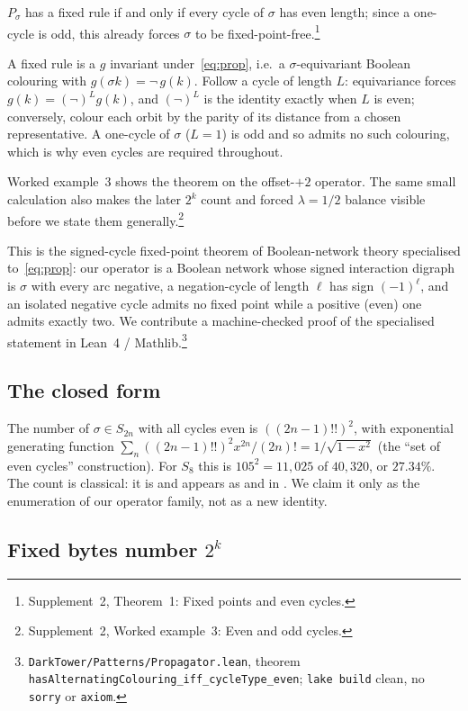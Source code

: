 \documentclass[man,12pt,floatsintext,donotrepeattitle]{apa7}
\newcommand{\sig}{\sigma}
\newcommand{\supptheorytext}[2]{Supplement~2, #1: #2.}
\newcommand{\supptheory}[2]{\footnote{\supptheorytext{#1}{#2}}}
\begin{document}
$P_\sig$ has a fixed rule if and only if every cycle of $\sig$ has even length;
since a one-cycle is odd, this already forces $\sig$ to be fixed-point-free.\supptheory{Theorem~1}{Fixed points and even cycles}

\noindent A fixed rule is a $g$ invariant under~\eqref{eq:prop}, i.e.\ a
$\sig$-equivariant Boolean colouring with $g(\sig k) = \lnot\,g(k)$.
Follow a cycle of length $L$: equivariance forces
$g(k) = (\lnot)^{L} g(k)$, and $(\lnot)^{L}$ is the identity exactly when
$L$ is even; conversely, colour each orbit by the parity of its distance
from a chosen representative. A one-cycle of $\sig$ ($L=1$) is odd and so
admits no such colouring, which is why even cycles are required throughout.

Worked example~3 shows the theorem on the offset-$+2$ operator. The
same small calculation also makes the later $2^k$ count and forced
$\lambda=1/2$ balance visible before we state them generally.\supptheory{Worked example~3}{Even and odd cycles}

This is the signed-cycle fixed-point theorem of Boolean-network theory
\parencite{aracena2008maximum} specialised to~\eqref{eq:prop}: our operator
is a Boolean network whose signed interaction digraph is $\sig$ with every
arc negative, a negation-cycle of length $\ell$ has sign $(-1)^\ell$, and
an isolated negative cycle admits no fixed point while a positive (even)
one admits exactly two. We contribute a machine-checked proof of the
specialised statement in Lean~4 / Mathlib.\footnote{%
\texttt{DarkTower/Patterns/Propagator.lean}, theorem
\texttt{hasAlternatingColouring\_iff\_cycleType\_even}; \texttt{lake build}
clean, no \texttt{sorry} or \texttt{axiom}.}

\subsection{The closed form}

The number of $\sig \in S_{2n}$ with all cycles even is $((2n-1)!!)^2$, with
exponential generating function $\sum_n ((2n-1)!!)^2 x^{2n}/(2n)! =
1/\sqrt{1-x^2}$ (the ``set of even cycles'' construction).
For $S_8$ this is $105^2 = 11{,}025$ of $40{,}320$, or $27.34\%$. The count
is classical: it is \textcite{oeis_a001818} and appears as
\textcite[Problem~5.34(c)]{stanley1999enumerative} and in
\textcite{riordan1968combinatorial}. We claim it only as the enumeration of
our operator family, not as a new identity.

\subsection{Fixed bytes number \texorpdfstring{$2^k$}{2 to the k}}
\end{document}
